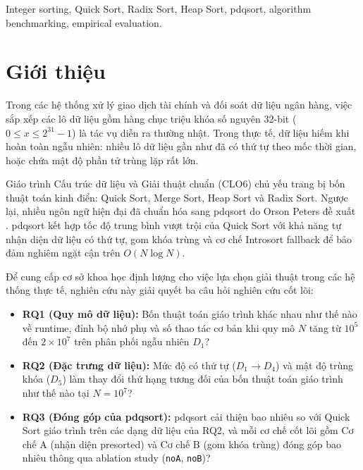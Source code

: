 \documentclass[conference]{IEEEtran}
\begin{document}
\begin{IEEEkeywords}
Integer sorting, Quick Sort, Radix Sort, Heap Sort, pdqsort, algorithm benchmarking, empirical evaluation.
\end{IEEEkeywords}

\section{Giới thiệu}
Trong các hệ thống xử lý giao dịch tài chính và đối soát dữ liệu ngân hàng, việc sắp xếp các lô dữ liệu gồm hàng chục triệu khóa số nguyên 32-bit ($0 \le x \le 2^{31}-1$) là tác vụ diễn ra thường nhật. Trong thực tế, dữ liệu hiếm khi hoàn toàn ngẫu nhiên: nhiều lô dữ liệu gần như đã có thứ tự theo mốc thời gian, hoặc chứa mật độ phần tử trùng lặp rất lớn.

Giáo trình Cấu trúc dữ liệu và Giải thuật chuẩn (CLO6) chủ yếu trang bị bốn thuật toán kinh điển: Quick Sort, Merge Sort, Heap Sort và Radix Sort. Ngược lại, nhiều ngôn ngữ hiện đại đã chuẩn hóa sang pdqsort do Orson Peters đề xuất \cite{peters2021pdqsort}. pdqsort kết hợp tốc độ trung bình vượt trội của Quick Sort với khả năng tự nhận diện dữ liệu có thứ tự, gom khóa trùng và cơ chế Introsort fallback để bảo đảm nghiêm ngặt cận trên $O(N \log N)$.

Để cung cấp cơ sở khoa học định lượng cho việc lựa chọn giải thuật trong các hệ thống thực tế, nghiên cứu này giải quyết ba câu hỏi nghiên cứu cốt lõi:
\begin{itemize}
    \item \textbf{RQ1 (Quy mô dữ liệu):} Bốn thuật toán giáo trình khác nhau như thế nào về runtime, đỉnh bộ nhớ phụ và số thao tác cơ bản khi quy mô $N$ tăng từ $10^5$ đến $2\times 10^7$ trên phân phối ngẫu nhiên $D_1$?
    \item \textbf{RQ2 (Đặc trưng dữ liệu):} Mức độ có thứ tự ($D_1 \to D_4$) và mật độ trùng khóa ($D_5$) làm thay đổi thứ hạng tương đối của bốn thuật toán giáo trình như thế nào tại $N = 10^7$?
    \item \textbf{RQ3 (Đóng góp của pdqsort):} pdqsort cải thiện bao nhiêu so với Quick Sort giáo trình trên các dạng dữ liệu của RQ2, và mỗi cơ chế cốt lõi gồm Cơ chế A (nhận diện presorted) và Cơ chế B (gom khóa trùng) đóng góp bao nhiêu thông qua ablation study (\texttt{noA}, \texttt{noB})?
\end{itemize}
\end{document}
